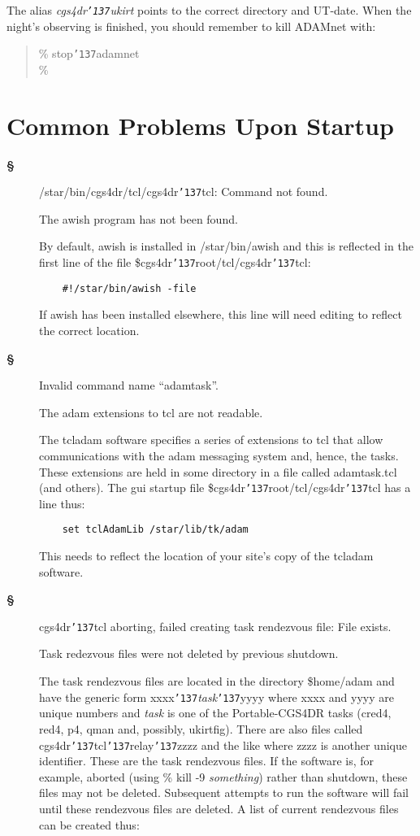 \documentclass[a4paper]{book}
\renewcommand{\_}{{\tt\char'137}}
\begin{document}
The alias {\it cgs4dr\_ukirt} points to the correct directory and UT-date.
When the night's observing is finished, you should remember to kill ADAMnet with:

\begin{minipage}{120mm}
\begin{quote}
  \%  stop\_adamnet \\
  \%
\end{quote}
\end{minipage}

\section{Common Problems Upon Startup}
\begin{description}
\item[{\bf \S}] {\sf /star/bin/cgs4dr/tcl/cgs4dr\_tcl: Command not found.} 

  The awish program has not been found.

  By default, awish is installed in /star/bin/awish and this is reflected
  in the first line of the file {\sc \$cgs4dr\_root}/tcl/cgs4dr\_tcl:
  \begin{verbatim}
    #!/star/bin/awish -file
  \end{verbatim}
  If awish has been installed elsewhere, this line will need editing to reflect 
  the correct location.

\item[{\bf \S}] {\sf Invalid command name ``adamtask''.}

  The {\sc adam} extensions to tcl are not readable. 

  The {\sc tcladam} software specifies a series of extensions to tcl that allow
  communications with the {\sc adam} messaging system and, hence, the tasks. These
  extensions are held in some directory in a file called adamtask.tcl (and others).
  The {\sc gui} startup file {\sc \$cgs4dr\_root}/tcl/cgs4dr\_tcl has a line thus:
  \begin{verbatim}
    set tclAdamLib /star/lib/tk/adam
  \end{verbatim}
  This needs to reflect the location of your site's copy of the {\sc tcladam} software.

\item[{\bf \S}] {\sf cgs4dr\_tcl aborting, failed creating task rendezvous file: File exists.}

  Task redezvous files were not deleted by previous shutdown.

  The task rendezvous files are located in the directory {\sc \$home}/adam and have the generic form 
  {\sf xxxx}\_{\em task}\_{\sf yyyy} where {\sf xxxx} and {\sf yyyy} are unique numbers
  and {\em task} is one of the Portable-CGS4DR tasks (cred4, red4, p4, qman and, possibly, ukirtfig).
  There are also files called cgs4dr\_tcl\_relay\_{\sf zzzz} and the like where {\sf zzzz}
  is another unique identifier. These are the task rendezvous files. If the software is, 
  for example, aborted (using \% kill -9 {\em something}) rather than shutdown, these files may not be deleted.
  Subsequent attempts to run the software will fail until these rendezvous files are
  deleted. A list of current rendezvous files can be created thus:


\end{description}
\end{document}

